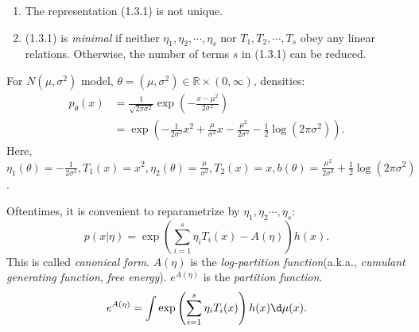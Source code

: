 \documentclass[a4paper]{article}
\begin{document}
\newpage
\begin{remark}
	\quad
	\begin{enumerate}
		\item The representation (1.3.1) is not unique.
		\item (1.3.1) is \emph{minimal} if neither ${\eta}_1, \eta_2, \cdots, {\eta}_s$ nor $T_1, T_2, \cdots, T_s$ obey any linear relations. Otherwise, the number of terms $s$ in (1.3.1) can be reduced.
	\end{enumerate}
\end{remark}

\begin{eg}
	For $N(\mu, {\sigma}^2)$ model, $\theta = (\mu, {\sigma}^2) \in \mathbb{R} \times (0, \infty)$, densities:
	\begin{equation*}
		\begin{aligned}
			p_{\theta} (x) &= \frac{1}{\sqrt{2 \pi {\sigma}^2}} \exp \left(- \frac{{x - \mu}^2}{2 {\sigma}^2}\right) \\
			&= \exp\left(-\frac{1}{2{\sigma}^2} x^2 + \frac{\mu}{{\sigma}^2}x - \frac{{\mu}^2}{2 {\sigma}^2} - \frac{1}{2} \log (2 \pi {\sigma}^2)\right).
		\end{aligned}
	\end{equation*}
	Here, $\eta_1 (\theta) = -\frac{1}{2{\sigma}^2}, T_1(x) = x^2, \eta_2 (\theta) = \frac{\mu}{{\sigma}^2}, T_2(x) = x, b(\theta) =  \frac{{\mu}^2}{2 {\sigma}^2} + \frac{1}{2} \log (2 \pi {\sigma}^2)$.
\end{eg}

\noindent Oftentimes, it is convenient to reparametrize by $\eta_1, \eta_2 \cdots, \eta_s$:
\begin{equation}
	p(x|\eta) = \exp \left(\sum\limits_{i = 1}^s \eta_i T_i (x) - A(\eta)\right)h(x).
\end{equation}
This is called \emph{canonical form}. $A(\eta)$ is the \emph{log-partition function}(a.k.a., \emph{cumulant generating function}, \emph{free energy}). $e^{A(\eta)}$ is the \emph{partition function}.
\begin{equation}
	e^{A(\eta)} = \int \exp\left(\sum\limits_{i = 1}^s \eta_i T_i (x)\right)h(x) \d \mu (x).
\end{equation}
\end{document}
